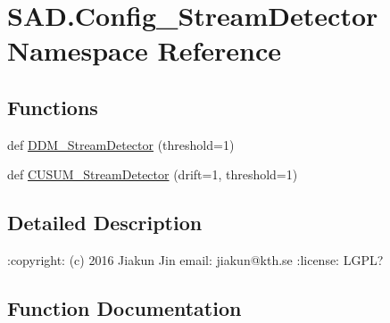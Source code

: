 \hypertarget{namespaceSAD_1_1Config__StreamDetector}{}\section{S\+A\+D.\+Config\+\_\+\+Stream\+Detector Namespace Reference}
\label{namespaceSAD_1_1Config__StreamDetector}
\subsection*{Functions}
\begin{DoxyCompactItemize}
\item 
def \hyperlink{namespaceSAD_1_1Config__StreamDetector_a833140ad9e4c0fb8a57ca3f3028c579e}{D\+D\+M\+\_\+\+Stream\+Detector} (threshold=1)
\item 
def \hyperlink{namespaceSAD_1_1Config__StreamDetector_a9b6e5608d3fa1ec9d349f060c106fe37}{C\+U\+S\+U\+M\+\_\+\+Stream\+Detector} (drift=1, threshold=1)
\end{DoxyCompactItemize}


\subsection{Detailed Description}
\begin{DoxyVerb}:copyright: (c) 2016 Jiakun Jin
email: jiakun@kth.se
:license: LGPL?
\end{DoxyVerb}
 

\subsection{Function Documentation}
